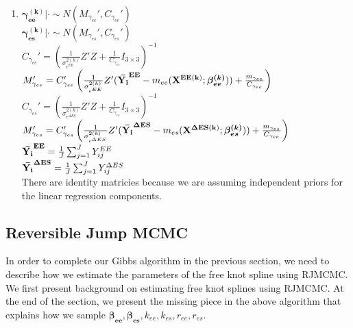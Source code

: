 \documentclass[11pt]{article}\usepackage[]{graphicx}\usepackage[]{color}
\begin{document}
\begin{enumerate}
\begin{enumerate}
\item
$\boldsymbol{\gamma_{ee}^{(k)}}|\cdot \sim N(M_{\gamma_{ee}}',C_{\gamma_{ee}}')$ \\
$\boldsymbol{\gamma_{es}^{(k)}}|\cdot \sim N(M_{\gamma_{es}}',C_{\gamma_{es}}')$ \\

$C_{\gamma_{ee}}' = \left( \frac{1}{\sigma^{2(k)}_{\epsilon^{EE}}} Z'Z + \frac{1}{C_{\gamma_{ee}}} I_{3 \times 3} \right)^{-1} $\\
$M_{\gamma_{ee}}' = C_{\gamma_{ee}}' \left( \frac{1}{\sigma^{2(k)}_{\epsilon^{EE}}} Z'({\bf \bar{Y_i}^{EE}} - m_{ee}({\bf X^{EE(k)}};\boldsymbol{\beta_{ee}^{(k)}})) + \frac{m_{\gamma_{ee}}}{C_{\gamma_{ee}} } \right)$ \\

$C_{\gamma_{es}}' = \left( \frac{1}{\sigma^{2(k)}_{\epsilon^{\Delta ES}}} Z'Z + \frac{1}{C_{\gamma_{es}}} I_{3 \times 3} \right)^{-1} $\\
$M_{\gamma_{es}}' = C_{\gamma_{es}}' \left( \frac{1}{\sigma^{2(k)}_{\epsilon^{\Delta ES}}} Z'({\bf \bar{Y_i}^{\Delta ES}} - m_{es}({\bf X^{\Delta ES(k)}};\boldsymbol{\beta_{es}^{(k)}})) + \frac{m_{\gamma_{es}}}{C_{\gamma_{ee}} } \right)$ \\

${\bf \bar{Y_i}^{EE}} = \frac{1}{J} \sum_{j=1}^{J} Y_{ij}^{EE}$ \\
${\bf \bar{Y_i}^{\Delta ES}} = \frac{1}{J} \sum_{j=1}^{J} Y_{ij}^{\Delta ES}$ \\

There are identity matricies because we are assuming independent priors for the linear regression components. 
\end{enumerate}

\end{enumerate}



\subsection{Reversible Jump MCMC}
In order to complete our Gibbs algorithm in the previous section, we need to describe how we estimate the parameters of the free knot spline using RJMCMC. We first present background on estimating free knot splines using RJMCMC. At the end of the section, we present the missing piece in the above algorithm that explains how we sample ${\boldsymbol{\beta_{ee}},\boldsymbol{\beta_{es}}},k_{ee},k_{es}, {  r_{ee}, r_{es}}$. 
\end{document}
